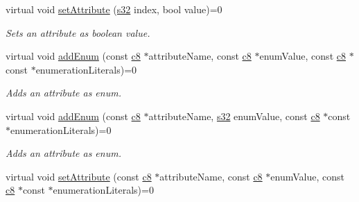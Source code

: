 \begin{DoxyCompactItemize}
\mbox{\label{classirr_1_1io_1_1IAttributes_a02fde3a6de462bd36b9338e2f3b35a92}} 
virtual void \hyperlink{classirr_1_1io_1_1IAttributes_a02fde3a6de462bd36b9338e2f3b35a92}{set\+Attribute} (\hyperlink{namespaceirr_ac66849b7a6ed16e30ebede579f9b47c6}{s32} index, bool value)=0
\begin{DoxyCompactList}\small\item\em Sets an attribute as boolean value. \end{DoxyCompactList}\item 
\mbox{\label{classirr_1_1io_1_1IAttributes_af03f3c31e9dadc98d875f993a8995819}} 
virtual void \hyperlink{classirr_1_1io_1_1IAttributes_af03f3c31e9dadc98d875f993a8995819}{add\+Enum} (const \hyperlink{namespaceirr_a9395eaea339bcb546b319e9c96bf7410}{c8} $\ast$attribute\+Name, const \hyperlink{namespaceirr_a9395eaea339bcb546b319e9c96bf7410}{c8} $\ast$enum\+Value, const \hyperlink{namespaceirr_a9395eaea339bcb546b319e9c96bf7410}{c8} $\ast$const $\ast$enumeration\+Literals)=0
\begin{DoxyCompactList}\small\item\em Adds an attribute as enum. \end{DoxyCompactList}\item 
\mbox{\label{classirr_1_1io_1_1IAttributes_a00fad990466737cced8be90079444fe4}} 
virtual void \hyperlink{classirr_1_1io_1_1IAttributes_a00fad990466737cced8be90079444fe4}{add\+Enum} (const \hyperlink{namespaceirr_a9395eaea339bcb546b319e9c96bf7410}{c8} $\ast$attribute\+Name, \hyperlink{namespaceirr_ac66849b7a6ed16e30ebede579f9b47c6}{s32} enum\+Value, const \hyperlink{namespaceirr_a9395eaea339bcb546b319e9c96bf7410}{c8} $\ast$const $\ast$enumeration\+Literals)=0
\begin{DoxyCompactList}\small\item\em Adds an attribute as enum. \end{DoxyCompactList}\item 
\mbox{\label{classirr_1_1io_1_1IAttributes_a4670e9270e610770245b2109c2b49597}} 
virtual void \hyperlink{classirr_1_1io_1_1IAttributes_a4670e9270e610770245b2109c2b49597}{set\+Attribute} (const \hyperlink{namespaceirr_a9395eaea339bcb546b319e9c96bf7410}{c8} $\ast$attribute\+Name, const \hyperlink{namespaceirr_a9395eaea339bcb546b319e9c96bf7410}{c8} $\ast$enum\+Value, const \hyperlink{namespaceirr_a9395eaea339bcb546b319e9c96bf7410}{c8} $\ast$const $\ast$enumeration\+Literals)=0

\end{DoxyCompactItemize}

